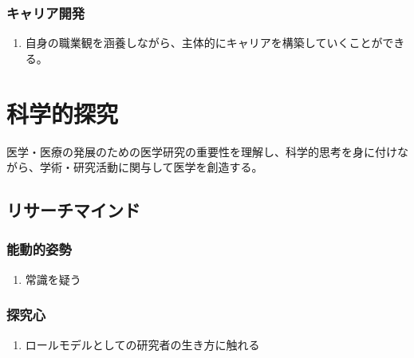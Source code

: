 \hypertarget{ux30adux30e3ux30eaux30a2ux958bux767a}{%
\subsubsection{キャリア開発}\label{ux30adux30e3ux30eaux30a2ux958bux767a}}

\begin{enumerate}
\def\labelenumi{\arabic{enumi}.}
\tightlist
\item
  自身の職業観を涵養しながら、主体的にキャリアを構築していくことができる。
\end{enumerate}

\newpage

\hypertarget{ux79d1ux5b66ux7684ux63a2ux7a76}{%
\section{科学的探究}\label{ux79d1ux5b66ux7684ux63a2ux7a76}}

医学・医療の発展のための医学研究の重要性を理解し、科学的思考を身に付けながら、学術・研究活動に関与して医学を創造する。

\hypertarget{ux30eaux30b5ux30fcux30c1ux30deux30a4ux30f3ux30c9}{%
\subsection{リサーチマインド}\label{ux30eaux30b5ux30fcux30c1ux30deux30a4ux30f3ux30c9}}

\hypertarget{ux80fdux52d5ux7684ux59ffux52e2}{%
\subsubsection{能動的姿勢}\label{ux80fdux52d5ux7684ux59ffux52e2}}

\begin{enumerate}
\def\labelenumi{\arabic{enumi}.}
\tightlist
\item
  常識を疑う
\end{enumerate}

\hypertarget{ux63a2ux7a76ux5fc3}{%
\subsubsection{探究心}\label{ux63a2ux7a76ux5fc3}}

\begin{enumerate}
\def\labelenumi{\arabic{enumi}.}
\tightlist
\item
  ロールモデルとしての研究者の生き方に触れる
\end{enumerate}

